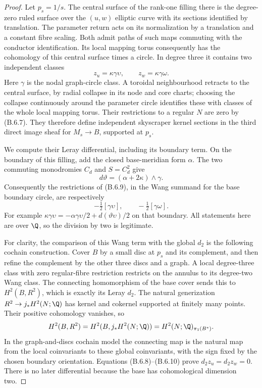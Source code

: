 \begin{proof}
Let $p_s=1/s$. The central surface of the rank-one filling there is
the degree-zero ruled surface over the $(u,w)$ elliptic curve with
its sections identified by translation. The parameter return acts
on its normalization by a translation and a constant fibre scaling.
Both admit paths of such maps commuting with the conductor
identification. Its local mapping torus consequently has the
cohomology of this central surface times a circle. In degree three
it contains two independent classes
\[
 z_u=\kappa\gamma\upsilon,\qquad
 z_w=\kappa\gamma\omega.
 \tag{B.6.9}
\]
Here $\gamma$ is the nodal graph-circle class. A toroidal
neighbourhood retracts to the central surface, by radial collapse
in its node and core charts; choosing the collapse continuously
around the parameter circle identifies these with classes of the
whole local mapping torus. Their restrictions to a regular $N$
are zero by (B.6.7). They therefore define independent skyscraper
kernel sections in the third direct image sheaf for $M_s\to B$,
supported at $p_s$.

We compute their Leray differential, including its boundary term.
On the boundary of this filling, add the closed base-meridian form
$\alpha$. The two commuting monodromies $C_d$ and $S=C_d^2$ give
\[
 d\vartheta=(\alpha+2\kappa)\wedge\gamma.
\]
Consequently the restrictions of (B.6.9), in the Wang summand for
the base boundary circle, are respectively
\[
 -\tfrac12[\gamma\upsilon],\qquad
 -\tfrac12[\gamma\omega].
 \tag{B.6.10}
\]
For example
$\kappa\gamma\upsilon=-\alpha\gamma\upsilon/2+
d(\vartheta\upsilon)/2$ on that boundary. All statements here are
over $\Q$, so the division by two is legitimate.

For clarity, the comparison of this Wang term with the global
$d_2$ is the following cochain construction. Cover $B$ by a small
disc at $p_s$ and its complement, and then refine the complement
by the other three discs and a graph. A local degree-three class
with zero regular-fibre restriction restricts on the annulus to
its degree-two Wang class. The connecting homomorphism of the
base cover sends this to $H^2(B,R^2)$, which is exactly its Leray
$d_2$. The natural generization $R^2\to j_*H^2(N;\Q)$ has kernel
and cokernel supported at finitely many points. Their positive
cohomology vanishes, so
\[
 H^2(B,R^2)=H^2(B,j_*H^2(N;\Q))
          =H^2(N;\Q)_{\pi_1(B^*)}.
\]
In the graph-and-discs cochain model the connecting map is the
natural map from the local coinvariants to these global
coinvariants, with the sign fixed by the chosen boundary
orientation. Equations (B.6.8)--(B.6.10) prove $d_2z_u=d_2z_w=0$.
There is no later differential because the base has cohomological
dimension two.


\end{proof}
